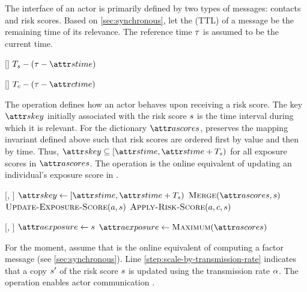 The interface of an actor is primarily defined by two types of messages: contacts and risk scores. Based on \cref{sec:synchronous}, let the  (TTL) of a message be the remaining time of its relevance. The reference time $\tau$ is assumed to be the current time.

\begin{function}{\nRiskScoreTtl}[\vScore]
  \State \Return $\pScoreExpiry - (\vReferenceTime - \aScoreTime)$
\end{function}

\begin{function}{\nContactTtl}[\vContact]
  \State \Return $\pContactExpiry - (\vReferenceTime - \aContactTime)$
\end{function}

The \cHandleRiskScore operation defines how an actor behaves upon receiving a risk score. The key $\aScoreKey$ initially associated with the risk score $s$ is the time interval during which it is relevant. For the dictionary $\aActorScores$, \cMerge preserves the mapping invariant defined above such that risk scores are ordered first by value and then by time. Thus, $\aScoreKey \subseteq [\aScoreTime, \aScoreTime + \pScoreExpiry)$ for all exposure scores in $\aActorScores$. The \cUpdateExposureScore operation is the online equivalent of updating an individual's exposure score in \cRiskPropagation.

\begin{function}[H]{\nHandleRiskScore}[\vActor, \vScore]
    \State $\aScoreKey \assign [\aScoreTime, \aScoreTime + \pScoreExpiry)$
    \State $\cMerge[\aActorScores, \vScore]$
    \State $\cUpdateExposureScore[\vActor, \vScore]$
    \ForEach{$\vContact \in \aActorContacts$}
      \State $\cApplyRiskScore[\vActor, \vContact, \vScore]$
    \EndFor
  \EndIf
\end{function}

\begin{function}[H]{\nUpdateExposureScore}[\vActor, \vScore]
  \If{$\aActorExposureValue < \aScoreValue$}
    \State $\aActorExposure \assign \vScore$
    \State $\aActorExposure \assign \cMaximum[\aActorScores]$
  \EndIf
\end{function}

For the moment, assume that \cApplyRiskScore is the online equivalent of computing a factor message (see \cref{sec:synchronous}). Line \ref{step:scale-by-transmission-rate} indicates that a copy $s'$ of the risk score $s$ is updated using the transmission rate $\alpha$. The \cSend operation enables actor communication \citep{Agha1985}.

